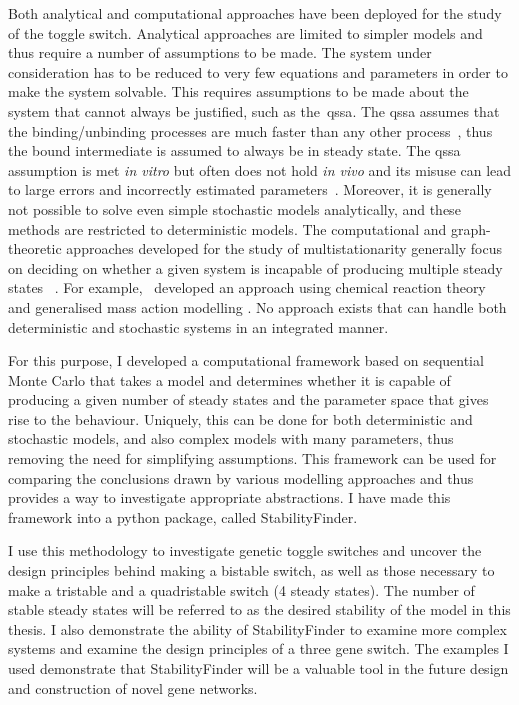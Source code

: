 Both analytical and computational approaches have been deployed for the study of the toggle switch. Analytical approaches are limited to simpler models and thus require a number of assumptions to be made. The system under consideration has to be reduced to very few equations and parameters in order to make the system solvable. This requires assumptions to be made about the system that cannot always be justified, such as the~\acrfull{qssa}. The \acrshort{qssa} assumes that the binding/unbinding processes are much faster than any other process~\autocite{Loinger:2007vma}, thus the bound intermediate is assumed to always be in steady state. The \acrshort{qssa} assumption is met \textit{in vitro} but often does not hold \textit{in vivo} and its misuse can lead to large errors and incorrectly estimated parameters~\autocite{Pedersen:2007ke}. Moreover, it is generally not possible to solve even simple stochastic models analytically, and these methods are restricted to deterministic models. The computational and graph-theoretic approaches developed for the study of multistationarity generally focus on deciding on whether a given system is incapable of producing multiple steady states ~\autocite{Conradi:2007jo, Banaji:2010fh,Feliu:2013dz}. For example,~\textcite{Feliu:2013dz} developed an approach using chemical reaction theory and generalised mass action modelling \autocite{Feliu:2013dz}. No approach exists that can handle both deterministic and stochastic systems in an integrated manner.

For this purpose, I developed a computational framework based on sequential Monte Carlo that takes a model and determines whether it is capable of producing a given number of steady states and the parameter space that gives rise to the behaviour. Uniquely, this can be done for both deterministic and stochastic models, and also complex models with many parameters, thus removing the need for simplifying assumptions. This framework can be used for comparing the conclusions drawn by various modelling approaches and thus provides a way to investigate appropriate abstractions. I have made this framework into a python package, called StabilityFinder. 

I use this methodology to investigate genetic toggle switches and uncover the design principles behind making a bistable switch, as well as those necessary to make a tristable and a quadristable switch (4 steady states). The number of stable steady states will be referred to as the desired stability of the model in this thesis. I also demonstrate the ability of StabilityFinder to examine more complex systems and examine the design principles of a three gene switch. The examples I used demonstrate that StabilityFinder will be a valuable tool in the future design and construction of novel gene networks. 




